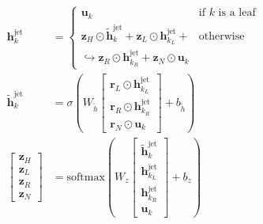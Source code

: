 \documentclass{beamer}
\begin{document}
\begin{frame}
\begin{columns}
\begin{column}{0.7\textwidth}
{         {\tiny
         \begin{align*}
         \mathbf{h}^\text{jet}_k &=
          \begin{cases}
           \mathbf{u}_k & \text{if } k \text{ is a leaf} \\
           \mathbf{z}_H \odot \tilde{\mathbf{h}}^\text{jet}_k + \mathbf{z}_L \odot \mathbf{h}^\text{jet}_{k_L} +  & \text{otherwise}\\
           \hookrightarrow \mathbf{z}_R \odot \mathbf{h}^\text{jet}_{k_R}  + \mathbf{z}_N \odot \mathbf{u}_{k} &
          \end{cases} \label{eqn:rec-nn-gated}\\
         \tilde{\mathbf{h}}^\text{jet}_k &= \sigma \left( W_{\tilde{h}}
         \begin{bmatrix}
             \mathbf{r}_L \odot \mathbf{h}^\text{jet}_{k_L} \\
             \mathbf{r}_R \odot \mathbf{h}^\text{jet}_{k_R} \\
             \mathbf{r}_N \odot \mathbf{u}_{k}
         \end{bmatrix} + b_{\tilde{h}} \right)\\
         \begin{bmatrix}
         \mathbf{z}_H \\
         \mathbf{z}_L \\
         \mathbf{z}_R \\
         \mathbf{z}_N
         \end{bmatrix} &= \text{softmax} \left( W_z
         \begin{bmatrix}
             \tilde{\mathbf{h}}^\text{jet}_k \\
             \mathbf{h}^\text{jet}_{k_L} \\
             \mathbf{h}^\text{jet}_{k_R} \\
             \mathbf{u}_{k}
         \end{bmatrix} + b_z
         \right) \\

\end{align*}}}
\end{column}
\end{columns}
\end{frame}
\end{document}
